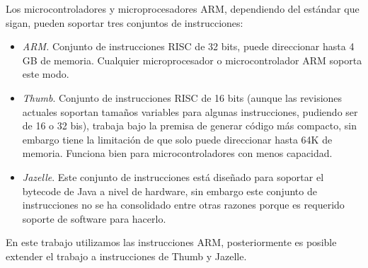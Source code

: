 Los microcontroladores y microprocesadores \ac{ARM}, dependiendo
del estándar que sigan, pueden soportar tres conjuntos de instrucciones:
\begin{itemize}
\item \emph{ARM.} Conjunto de instrucciones RISC de 32 bits, puede direccionar
hasta 4 GB de memoria. Cualquier microprocesador o microcontrolador
\ac{ARM} soporta este modo.
\item \emph{Thumb}. Conjunto de instrucciones RISC de 16 bits (aunque las
revisiones actuales soportan tamaños variables para algunas instrucciones,
pudiendo ser de 16 o 32 bis), trabaja bajo la premisa de generar código
más compacto, sin embargo tiene la limitación de que solo puede direccionar
hasta 64K de memoria. Funciona bien para microcontroladores con menos
capacidad.
\item \emph{Jazelle}. Este conjunto de instrucciones está diseñado para
soportar el bytecode de Java a nivel de hardware, sin embargo este
conjunto de instrucciones no se ha consolidado entre otras razones
porque es requerido soporte de software para hacerlo. 
\end{itemize}
En este trabajo utilizamos las instrucciones ARM, posteriormente es
posible extender el trabajo a instrucciones de Thumb y Jazelle.


